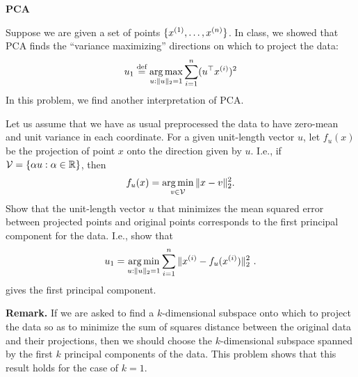 \item {} {\bf PCA}

Suppose we are given a set of points $\{x^{(1)},\ldots,x^{(\nexp)}\}$.
In class, we showed that PCA finds the ``variance maximizing'' directions on
which to project the data:
$$
u_1 \overset{\textrm{def}}{=} \argmax_{u:\|u\|_2=1} \sum_{i=1}^n (u\T\xsi)^2
$$
In this problem, we find another interpretation of PCA. 

Let us assume that we have as usual preprocessed the data to have zero-mean and unit variance
in each coordinate.  For a given unit-length vector $u$, let $f_u(x)$ be the 
projection of point $x$ onto the direction given by $u$.  I.e., if 
${\cal V} = \{\alpha u : \alpha \in \Re\}$, then 
$$
f_u(x) = \argmin_{v\in {\cal V}} \|x-v\|_2^2.
$$
Show that the unit-length vector $u$ that minimizes the 
mean squared error between projected points and original points corresponds
to the first principal component for the data. I.e., show that
$$ u_1 = \argmin_{u:\|u\|_2=1} \sum_{i=1}^\nexp \|x^{(i)}-f_u(x^{(i)})\|_2^2 \ .$$
gives the first principal component.


{\bf Remark.} If we are asked to find a $k$-dimensional subspace onto which to
project the data so as to minimize the sum of squares distance between the
original data and their projections, then we should choose the $k$-dimensional
subspace spanned by the first $k$ principal components of the data.  This problem
shows that this result holds for the case of $k=1$.

\ifnum{} {
  
} \fi

  
